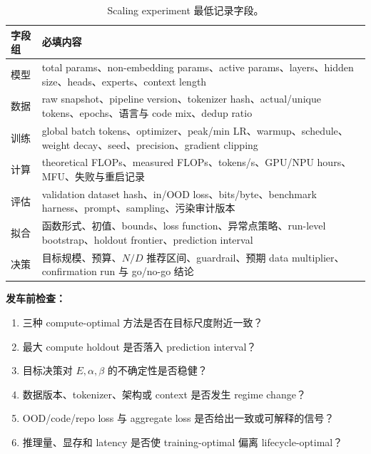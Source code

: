 \documentclass[UTF8,10pt,a4paper,fontset=none]{ctexart}
\begin{document}
\begin{table}[htbp]
\centering
\caption{Scaling experiment 最低记录字段。}\label{zh:tab:schema}
\begin{tabularx}{\textwidth}{p{4.0cm}X}
\toprule
字段组 & 必填内容 \\
\midrule
模型 & total params、non-embedding params、active params、layers、hidden size、heads、experts、context length \\
数据 & raw snapshot、pipeline version、tokenizer hash、actual/unique tokens、epochs、语言与 code mix、dedup ratio \\
训练 & global batch tokens、optimizer、peak/min LR、warmup、schedule、weight decay、seed、precision、gradient clipping \\
计算 & theoretical FLOPs、measured FLOPs、tokens/s、GPU/NPU hours、MFU、失败与重启记录 \\
评估 & validation dataset hash、in/OOD loss、bits/byte、benchmark harness、prompt、sampling、污染审计版本 \\
拟合 & 函数形式、初值、bounds、loss function、异常点策略、run-level bootstrap、holdout frontier、prediction interval \\
决策 & 目标规模、预算、$N/D$ 推荐区间、guardrail、预期 data multiplier、confirmation run 与 go/no-go 结论 \\
\bottomrule
\end{tabularx}
\end{table}

\noindent\textbf{发车前检查：}
\begin{enumerate}
  \item 三种 compute-optimal 方法是否在目标尺度附近一致？
  \item 最大 compute holdout 是否落入 prediction interval？
  \item 目标决策对 $E,\alpha,\beta$ 的不确定性是否稳健？
  \item 数据版本、tokenizer、架构或 context 是否发生 regime change？
  \item OOD/code/repo loss 与 aggregate loss 是否给出一致或可解释的信号？
  \item 推理量、显存和 latency 是否使 training-optimal 偏离 lifecycle-optimal？
\end{enumerate}
\end{document}
